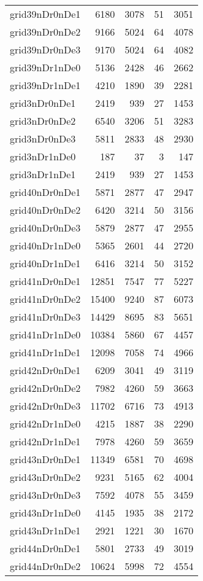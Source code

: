\begin{longtable}{lrrrr}
grid39nDr0nDe1 & 6180 & 3078 & 51 & 3051 \\
grid39nDr0nDe2 & 9166 & 5024 & 64 & 4078 \\
grid39nDr0nDe3 & 9170 & 5024 & 64 & 4082 \\
grid39nDr1nDe0 & 5136 & 2428 & 46 & 2662 \\
grid39nDr1nDe1 & 4210 & 1890 & 39 & 2281 \\
grid3nDr0nDe1 & 2419 & 939 & 27 & 1453 \\
grid3nDr0nDe2 & 6540 & 3206 & 51 & 3283 \\
grid3nDr0nDe3 & 5811 & 2833 & 48 & 2930 \\
grid3nDr1nDe0 & 187 & 37 & 3 & 147 \\
grid3nDr1nDe1 & 2419 & 939 & 27 & 1453 \\
grid40nDr0nDe1 & 5871 & 2877 & 47 & 2947 \\
grid40nDr0nDe2 & 6420 & 3214 & 50 & 3156 \\
grid40nDr0nDe3 & 5879 & 2877 & 47 & 2955 \\
grid40nDr1nDe0 & 5365 & 2601 & 44 & 2720 \\
grid40nDr1nDe1 & 6416 & 3214 & 50 & 3152 \\
grid41nDr0nDe1 & 12851 & 7547 & 77 & 5227 \\
grid41nDr0nDe2 & 15400 & 9240 & 87 & 6073 \\
grid41nDr0nDe3 & 14429 & 8695 & 83 & 5651 \\
grid41nDr1nDe0 & 10384 & 5860 & 67 & 4457 \\
grid41nDr1nDe1 & 12098 & 7058 & 74 & 4966 \\
grid42nDr0nDe1 & 6209 & 3041 & 49 & 3119 \\
grid42nDr0nDe2 & 7982 & 4260 & 59 & 3663 \\
grid42nDr0nDe3 & 11702 & 6716 & 73 & 4913 \\
grid42nDr1nDe0 & 4215 & 1887 & 38 & 2290 \\
grid42nDr1nDe1 & 7978 & 4260 & 59 & 3659 \\
grid43nDr0nDe1 & 11349 & 6581 & 70 & 4698 \\
grid43nDr0nDe2 & 9231 & 5165 & 62 & 4004 \\
grid43nDr0nDe3 & 7592 & 4078 & 55 & 3459 \\
grid43nDr1nDe0 & 4145 & 1935 & 38 & 2172 \\
grid43nDr1nDe1 & 2921 & 1221 & 30 & 1670 \\
grid44nDr0nDe1 & 5801 & 2733 & 49 & 3019 \\
grid44nDr0nDe2 & 10624 & 5998 & 72 & 4554 \\

\end{longtable}
